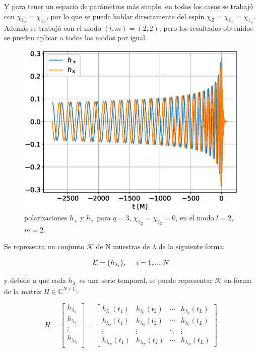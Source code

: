 Y para tener un espacio de parámetros más simple, en todos los casos se trabajó con $\chi_{1_Z} = \chi_{1_Z}$, por lo que se puede hablar directamente del espín $\chi_{Z}=\chi_{1_Z} = \chi_{1_Z}$. Además se trabajó con el modo $(l, m) =(2, 2)$, pero los resultados obtenidos se pueden aplicar a todos los modos por igual.

\begin{figure}[h]
\centering
\includegraphics[width=.9\columnwidth]{figs/h_l2m2_q3.eps}
\caption{polarizaciones \(h_+\) y \(h_{\times}\) para $q = 3$, $\chi_{1_Z} = \chi_{2_Z} = 0$, en el modo $l=2$, $m=2$.}
\label{fig:h_q3}
\end{figure}



Se representa un conjunto \( \mathcal{K} \) de N muestras de $\lambda$ de la siguiente forma:

\[ \mathcal{K}  = \{h_{\lambda_i}\}, \hspace{5mm} i = 1, ..., N\]

y debido a que cada $h_{\lambda_i}$ es una serie temporal, se puede representar $\mathcal{K}$ en forma de la matriz $H \in \mathbb{C}^{N\times L}$:

\[
H = 
\begin{bmatrix}
h_{\lambda_1} \\
h_{\lambda_2} \\
 \vdots \\
 h_{\lambda_N} \\
\end{bmatrix}
= 
\begin{bmatrix}
h_{\lambda_1}(t_1) & h_{\lambda_1}(t_2)  & \cdots & h_{\lambda_1}(t_L)\\
 h_{\lambda_2}(t_1) & h_{\lambda_2}(t_2)  & \cdots & h_{\lambda_2}(t_L)\\
 \vdots & \vdots & \ddots &  \vdots \\
h_{\lambda_N}(t_1) & h_{\lambda_N}(t_2)  & \cdots & h_{\lambda_N}(t_L)
\end{bmatrix}
\]


